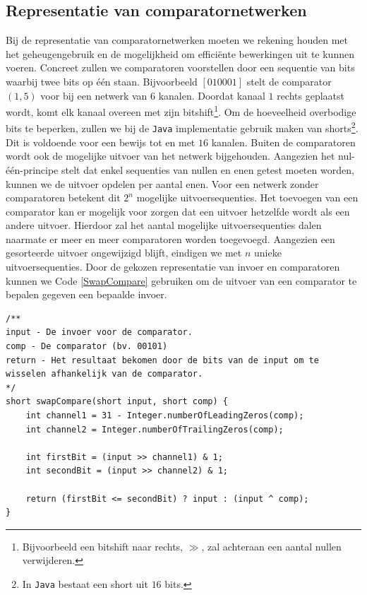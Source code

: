 \documentclass{article}
\begin{document}
\subsection{Representatie van comparatornetwerken}\label{RepresentatieVanComparatorNetwerken}
Bij de representatie van comparatornetwerken moeten we rekening houden met het geheugengebruik en de mogelijkheid om effici\"ente bewerkingen uit te kunnen voeren.
Concreet zullen we comparatoren voorstellen door een sequentie van bits waarbij twee bits op \'e\'en staan.
Bijvoorbeeld  $ \left[ 0 1 0 0 0 1\right]$ stelt de comparator $\left(1,5\right)$ voor bij een netwerk van $6$ kanalen.
Doordat kanaal $1$ rechts geplaatst wordt, komt elk kanaal overeen met zijn bitshift\footnote{Bijvoorbeeld een bitshift naar rechts, $\gg$, zal achteraan een aantal nullen verwijderen.}.
Om de hoeveelheid overbodige bits te beperken, zullen we bij de \texttt{Java} implementatie gebruik maken van shorts\footnote{In \texttt{Java} bestaat een short uit $16$ bits.}.
Dit is voldoende voor een bewijs tot en met $16$ kanalen.
Buiten de comparatoren wordt ook de mogelijke uitvoer van het netwerk bijgehouden.
Aangezien het nul-\'e\'en-principe stelt dat enkel sequenties van nullen en enen getest moeten worden, kunnen we de uitvoer opdelen per aantal enen.
Voor een netwerk zonder comparatoren betekent dit $2^n$ mogelijke uitvoersequenties.
Het toevoegen van een comparator kan er mogelijk voor zorgen dat een uitvoer hetzelfde wordt als een andere uitvoer.
Hierdoor zal het aantal mogelijke uitvoersequenties dalen naarmate er meer en meer comparatoren worden toegevoegd.
Aangezien een gesorteerde uitvoer ongewijzigd blijft, eindigen we met $n$ unieke uitvoersequenties.
Door de gekozen representatie van invoer en comparatoren kunnen we Code \ref{SwapCompare} gebruiken om de uitvoer van een comparator te bepalen gegeven een bepaalde invoer.
\begin{lstlisting}[caption={swapCompare},label=SwapCompare]
/**
input - De invoer voor de comparator.
comp - De comparator (bv. 00101)
return - Het resultaat bekomen door de bits van de input om te wisselen afhankelijk van de comparator.
*/
short swapCompare(short input, short comp) {
	int channel1 = 31 - Integer.numberOfLeadingZeros(comp);
	int channel2 = Integer.numberOfTrailingZeros(comp);
	
	int firstBit = (input >> channel1) & 1;
	int secondBit = (input >> channel2) & 1;
	
	return (firstBit <= secondBit) ? input : (input ^ comp);
}
\end{lstlisting}
\end{document}
